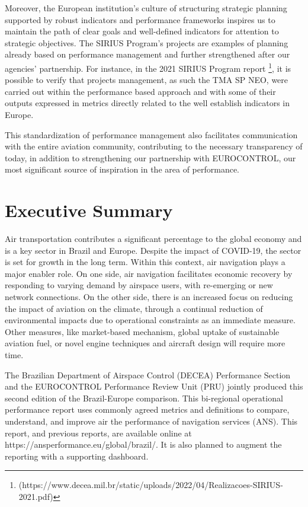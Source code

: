 \documentclass[
  a4paper,
  DIV=11,
  numbers=noendperiod]{scrreprt}
\begin{document}
Moreover, the European institution's culture of structuring strategic
planning supported by robust indicators and performance frameworks
inspires us to maintain the path of clear goals and well-defined
indicators for attention to strategic objectives. The SIRIUS Program's
projects are examples of planning already based on performance
management and further strengthened after our agencies' partnership. For
instance, in the 2021 SIRIUS Program report \footnote{(https://www.decea.mil.br/static/uploads/2022/04/Realizacoes-SIRIUS-2021.pdf)},
it is possible to verify that projects management, as such the TMA SP
NEO, were carried out within the performance based approach and with
some of their outputs expressed in metrics directly related to the well
establish indicators in Europe.

This standardization of performance management also facilitates
communication with the entire aviation community, contributing to the
necessary transparency of today, in addition to strengthening our
partnership with EUROCONTROL, our most significant source of inspiration
in the area of performance.

\onecolumn
\newpage


\hypertarget{executive-summary}{%
\chapter*{Executive Summary}\label{executive-summary}}

Air transportation contributes a significant percentage to the global
economy and is a key sector in Brazil and Europe. Despite the impact of
COVID-19, the sector is set for growth in the long term. Within this
context, air navigation plays a major enabler role. On one side, air
navigation facilitates economic recovery by responding to varying demand
by airspace users, with re-emerging or new network connections. On the
other side, there is an increased focus on reducing the impact of
aviation on the climate, through a continual reduction of environmental
impacts due to operational constraints as an immediate measure. Other
measures, like market-based mechanism, global uptake of sustainable
aviation fuel, or novel engine techniques and aircraft design will
require more time.

The Brazilian Department of Airspace Control (DECEA) Performance Section
and the EUROCONTROL Performance Review Unit (PRU) jointly produced this
second edition of the Brazil-Europe comparison. This bi-regional
operational performance report uses commonly agreed metrics and
definitions to compare, understand, and improve air the performance of
navigation services (ANS). This report, and previous reports, are
available online at https://ansperformance.eu/global/brazil/. It is also
planned to augment the reporting with a supporting dashboard.
\end{document}
